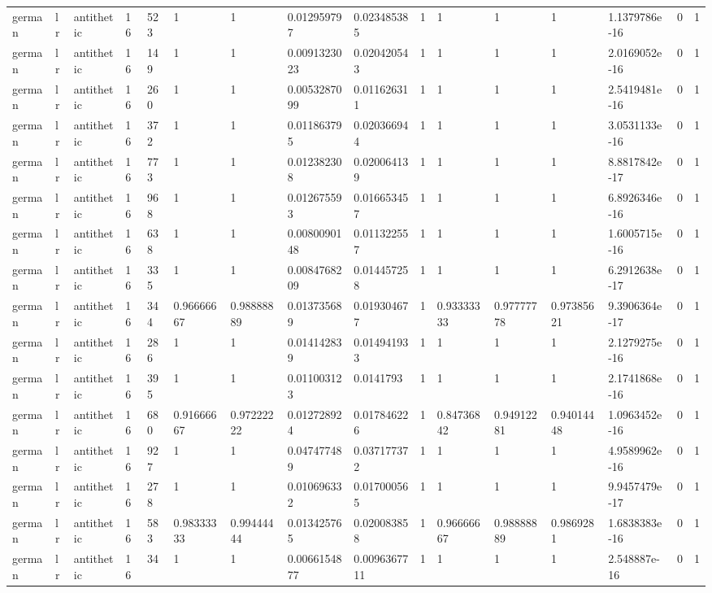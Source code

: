 \begin{tabular}{llllllllllllllll}
german & lr & antithetic & 16 & 523 & 1 & 1 & 0.012959797 & 0.023485385 & 1 & 1 & 1 & 1 & 1.1379786e-16 & 0 & 1 \\
german & lr & antithetic & 16 & 149 & 1 & 1 & 0.0091323023 & 0.020420543 & 1 & 1 & 1 & 1 & 2.0169052e-16 & 0 & 1 \\
german & lr & antithetic & 16 & 260 & 1 & 1 & 0.0053287099 & 0.011626311 & 1 & 1 & 1 & 1 & 2.5419481e-16 & 0 & 1 \\
german & lr & antithetic & 16 & 372 & 1 & 1 & 0.011863795 & 0.020366944 & 1 & 1 & 1 & 1 & 3.0531133e-16 & 0 & 1 \\
german & lr & antithetic & 16 & 773 & 1 & 1 & 0.012382308 & 0.020064139 & 1 & 1 & 1 & 1 & 8.8817842e-17 & 0 & 1 \\
german & lr & antithetic & 16 & 968 & 1 & 1 & 0.012675593 & 0.016653457 & 1 & 1 & 1 & 1 & 6.8926346e-16 & 0 & 1 \\
german & lr & antithetic & 16 & 638 & 1 & 1 & 0.0080090148 & 0.011322557 & 1 & 1 & 1 & 1 & 1.6005715e-16 & 0 & 1 \\
german & lr & antithetic & 16 & 335 & 1 & 1 & 0.0084768209 & 0.014457258 & 1 & 1 & 1 & 1 & 6.2912638e-17 & 0 & 1 \\
german & lr & antithetic & 16 & 344 & 0.96666667 & 0.98888889 & 0.013735689 & 0.019304677 & 1 & 0.93333333 & 0.97777778 & 0.97385621 & 9.3906364e-17 & 0 & 1 \\
german & lr & antithetic & 16 & 286 & 1 & 1 & 0.014142839 & 0.014941933 & 1 & 1 & 1 & 1 & 2.1279275e-16 & 0 & 1 \\
german & lr & antithetic & 16 & 395 & 1 & 1 & 0.011003123 & 0.0141793 & 1 & 1 & 1 & 1 & 2.1741868e-16 & 0 & 1 \\
german & lr & antithetic & 16 & 680 & 0.91666667 & 0.97222222 & 0.012728924 & 0.017846226 & 1 & 0.84736842 & 0.94912281 & 0.94014448 & 1.0963452e-16 & 0 & 1 \\
german & lr & antithetic & 16 & 927 & 1 & 1 & 0.047477489 & 0.037177372 & 1 & 1 & 1 & 1 & 4.9589962e-16 & 0 & 1 \\
german & lr & antithetic & 16 & 278 & 1 & 1 & 0.010696332 & 0.017000565 & 1 & 1 & 1 & 1 & 9.9457479e-17 & 0 & 1 \\
german & lr & antithetic & 16 & 583 & 0.98333333 & 0.99444444 & 0.013425765 & 0.020083858 & 1 & 0.96666667 & 0.98888889 & 0.9869281 & 1.6838383e-16 & 0 & 1 \\
german & lr & antithetic & 16 & 34 & 1 & 1 & 0.0066154877 & 0.0096367711 & 1 & 1 & 1 & 1 & 2.548887e-16 & 0 & 1 \\

\end{tabular}
